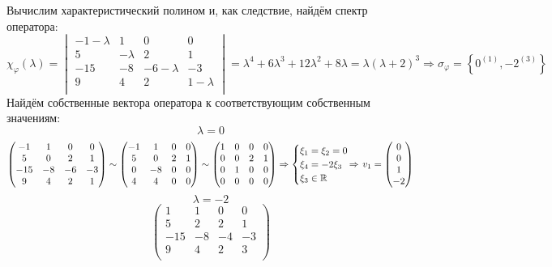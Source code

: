 \documentclass{article}
\newcommand{\la}{\lambda}
\newcommand{\shiftleft}[3]{\makebox[#1][r]{\makebox[#2][l]{#3}}}
\begin{document}
\begin{center}
Вычислим характеристический полином и, как следствие, найдём спектр оператора:
$$\chi_\varphi(\la) = \begin{vmatrix}
-1-\la & 1 & 0 & 0 \\
5 & -\la & 2 & 1 \\
-15 & -8 & -6-\la & -3 \\
9 & 4 & 2 & 1-\la \\
\end{vmatrix} = \la^4+6\la^3+12\la^2+8\la = \la(\la + 2)^3 \Rightarrow \sigma_\varphi = \left\{0^{(1)}, -2^{(3)}\right\}$$
Найдём собственные вектора оператора к соответствующим собственным значениям:
$$\la = 0$$
$$\begin{pmatrix}
-1 & 1 & 0 & 0 \\
5 & 0 & 2 & 1 \\
-15 & -8 & -6 & -3 \\
9 & 4 & 2 & 1 \\
\end{pmatrix} \sim \begin{pmatrix}
-1 & 1 & 0 & 0 \\
5 & 0 & 2 & 1 \\
0 & -8 & 0 & 0 \\
4 & 4 & 0 & 0 \\
\end{pmatrix} \sim \begin{pmatrix}
1 & 0 & 0 & 0 \\
0 & 0 & 2 & 1 \\
0 & 1 & 0 & 0 \\
0 & 0 & 0 & 0 \\
\end{pmatrix} \Rightarrow \begin{cases}
\xi_1 = \xi_2 = 0 \\
\xi_4 = -2\xi_3 \\
\xi_3 \in \mathbb{R}
\end{cases} \shiftleft{3pt}{14pt}{$\Rightarrow$} v_1 = \begin{pmatrix}
0 \\ 0 \\ 1 \\ -2
\end{pmatrix}$$
$$\la = -2$$
$$\begin{pmatrix}
1 & 1 & 0 & 0 \\
5 & 2 & 2 & 1 \\
-15 & -8 & -4 & -3 \\
9 & 4 & 2 & 3 \\

\end{pmatrix}$$
\end{center}
\end{document}

